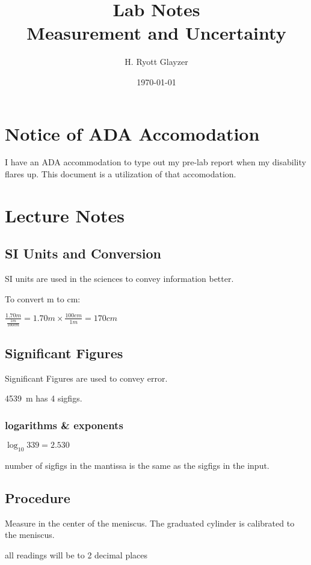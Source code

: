 \documentclass[10pt, letterpaper]{article}
\begin{document}


\title{Lab Notes \\ \large Measurement and Uncertainty}
\author{H. Ryott Glayzer}
\date{\today}


\maketitle


\section*{Notice of ADA Accomodation}
I have an ADA accommodation to type out my pre-lab report when my disability flares up.
This document is a utilization of that accomodation.




\section{Lecture Notes}

\subsection{SI Units and Conversion}

SI units are used in the sciences to convey information better.

To convert \si{\meter} to \si{\centi\meter}:

$\frac{1.70m}{\frac{1m}{100cm}}=1.70m\times\frac{100cm}{1m}=170cm$



\subsection{Significant Figures}

Significant Figures are used to convey error.

\SI{4539}{\meter} has 4 sigfigs.


\subsubsection{logarithms \& exponents}

$\log_{10}{339} = 2.530$

number of sigfigs in the mantissa is the same as the sigfigs in the input.



\subsection{Procedure}

Measure in the center of the meniscus. 
The graduated cylinder is calibrated to the meniscus. 

all readings will be to 2 decimal places
\end{document}
